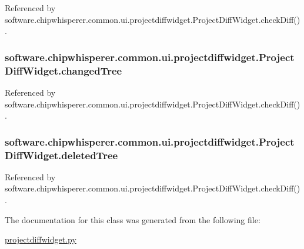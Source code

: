 Referenced by software.\+chipwhisperer.\+common.\+ui.\+projectdiffwidget.\+Project\+Diff\+Widget.\+check\+Diff().

\hypertarget{classsoftware_1_1chipwhisperer_1_1common_1_1ui_1_1projectdiffwidget_1_1ProjectDiffWidget_ab6906fd3d24048adb62e9717c03c1cfd}{}
\subsubsection[{changed\+Tree}]{\setlength{\rightskip}{0pt plus 5cm}software.\+chipwhisperer.\+common.\+ui.\+projectdiffwidget.\+Project\+Diff\+Widget.\+changed\+Tree}\label{classsoftware_1_1chipwhisperer_1_1common_1_1ui_1_1projectdiffwidget_1_1ProjectDiffWidget_ab6906fd3d24048adb62e9717c03c1cfd}


Referenced by software.\+chipwhisperer.\+common.\+ui.\+projectdiffwidget.\+Project\+Diff\+Widget.\+check\+Diff().

\hypertarget{classsoftware_1_1chipwhisperer_1_1common_1_1ui_1_1projectdiffwidget_1_1ProjectDiffWidget_a22c6825aa183df4fa6337d977eb5e9bd}{}
\subsubsection[{deleted\+Tree}]{\setlength{\rightskip}{0pt plus 5cm}software.\+chipwhisperer.\+common.\+ui.\+projectdiffwidget.\+Project\+Diff\+Widget.\+deleted\+Tree}\label{classsoftware_1_1chipwhisperer_1_1common_1_1ui_1_1projectdiffwidget_1_1ProjectDiffWidget_a22c6825aa183df4fa6337d977eb5e9bd}


Referenced by software.\+chipwhisperer.\+common.\+ui.\+projectdiffwidget.\+Project\+Diff\+Widget.\+check\+Diff().



The documentation for this class was generated from the following file\+:\begin{DoxyCompactItemize}
\item 
\hyperlink{projectdiffwidget_8py}{projectdiffwidget.\+py}\end{DoxyCompactItemize}
